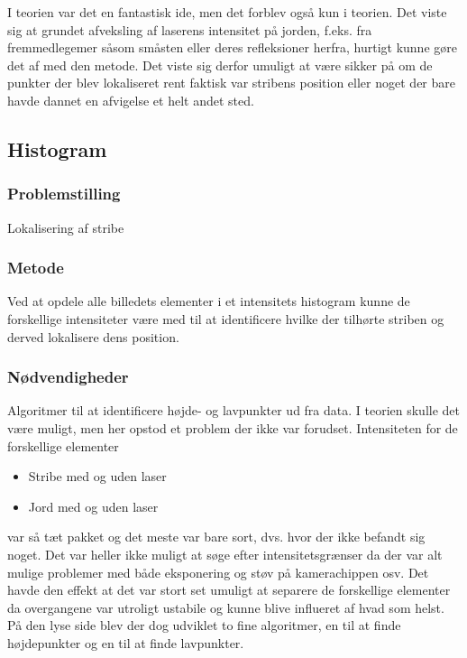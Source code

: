 I teorien var det en fantastisk ide, men det forblev også kun i teorien. Det viste sig at grundet afveksling af laserens intensitet på jorden, f.eks. fra fremmedlegemer såsom småsten eller deres refleksioner herfra, hurtigt kunne gøre det af med den metode.
Det viste sig derfor umuligt at være sikker på om de punkter der blev lokaliseret rent faktisk var stribens position eller noget der bare havde dannet en afvigelse et helt andet sted.

\subsection{Histogram}

\subsubsection{Problemstilling}
Lokalisering af stribe

\subsubsection{Metode}
Ved at opdele alle billedets elementer i et intensitets histogram kunne de forskellige intensiteter være med til at identificere hvilke der tilhørte 
striben og derved lokalisere dens position.
\\
\subsubsection{Nødvendigheder}
Algoritmer til at identificere højde- og lavpunkter ud fra data.
I teorien skulle det være muligt, men her opstod et problem der ikke var forudset. Intensiteten for de forskellige elementer
\begin{itemize}
	\item Stribe med og uden laser
	\item Jord med og uden laser
\end{itemize}

var så tæt pakket og det meste var bare sort, dvs. hvor der ikke befandt sig noget. Det var heller ikke muligt at søge efter intensitetsgrænser da der var alt mulige problemer med både eksponering og støv på kamerachippen osv.
Det havde den effekt at det var stort set umuligt at separere de forskellige elementer da overgangene var utroligt ustabile og kunne blive influeret af hvad som helst. På den lyse side blev der dog udviklet to fine algoritmer, en til at finde højdepunkter og en til at finde lavpunkter.

